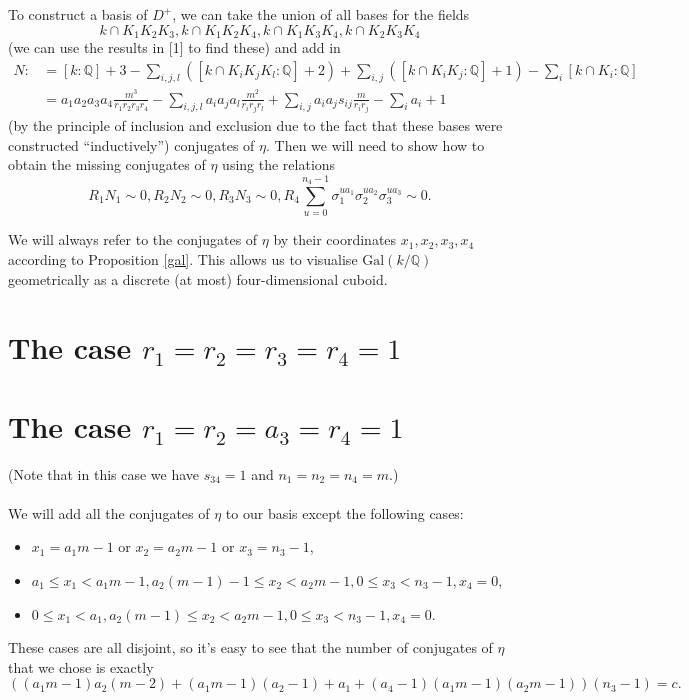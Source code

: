 \documentclass[12pt,a4paper]{article}
\theoremstyle{definition}
\newcommand{\Q}{\mathbb{Q}}
\newcommand{\Gal}{\mathrm{Gal}}
\begin{document}
To construct a basis of $D^+$, we can take the union of all bases for the fields $$k\cap K_1K_2K_3,k\cap K_1K_2K_4,k\cap K_1K_3K_4,k\cap K_2K_3K_4$$ (we can use the results in [1] to find these) and add in
\begin{equation*}
\begin{split}
N:&=[k:\Q]+3-\sum_{i,j,l}([k\cap K_iK_jK_l:\Q]+2)+\sum_{i,j}([k\cap K_iK_j:\Q]+1)-\sum_{i}[k\cap K_i:\Q]\\&=a_1a_2a_3a_4\frac{m^3}{r_1r_2r_3r_4}-\sum_{i,j,l}a_ia_ja_l\frac{m^2}{r_ir_jr_l}+\sum_{i,j}
a_ia_js_{ij}\frac{m}{r_ir_j}-\sum_{i}a_i+1
\end{split}
\end{equation*}
(by the principle of inclusion and exclusion due to the fact that these bases were constructed \enquote{inductively}) conjugates of $\eta$. Then we will need to show how to obtain the missing conjugates of $\eta$ using the relations $$R_1N_1\sim 0, R_2N_2\sim 0, R_3N_3\sim 0, R_4\sum_{u=0}^{n_4-1}\sigma_1^{ua_1}\sigma_2^{ua_2}\sigma_3^{ua_3}\sim 0.$$

We will always refer to the conjugates of $\eta$ by their coordinates $x_1,x_2,x_3,x_4$ according to Proposition \ref{gal}. This allows us to visualise $\Gal(k/\Q)$ geometrically as a discrete (at most) four-dimensional cuboid.
\section{The case $r_1=r_2=r_3=r_4=1$}
\section{The case $r_1=r_2=a_3=r_4=1$}
(Note that in this case we have $s_{34}=1$ and $n_1=n_2=n_4=m$.) %
\paragraph*{}
We will add all the conjugates of $\eta$ to our basis except the following cases:
\begin{itemize}
\item $x_1=a_1m-1$ or $x_2=a_2m-1$ or $x_3=n_3-1$,
\item $a_1\leq x_1 < a_1m-1, a_2(m-1)-1 \leq x_2 < a_2m-1, 0\leq x_3 < n_3-1, x_4=0$,
\item $0\leq x_1 < a_1, a_2(m-1) \leq x_2 < a_2m-1, 0\leq x_3 < n_3-1, x_4=0$.
\end{itemize}
These cases are all disjoint, so it's easy to see that the number of conjugates of $\eta$ that we chose is exactly
$$((a_1m-1)a_2(m-2)+(a_1m-1)(a_2-1)+a_1+(a_4-1)(a_1m-1)(a_2m-1))\left(n_3-1\right)=c.$$
\end{document}
